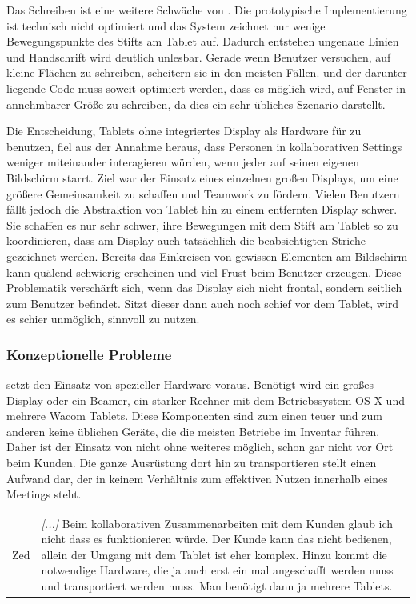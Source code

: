 \medskip Das Schreiben ist eine weitere Schwäche von \scribbler. Die prototypische Implementierung ist technisch nicht optimiert und das System zeichnet nur wenige Bewegungspunkte des Stifts am Tablet auf. Dadurch entstehen ungenaue Linien und Handschrift wird deutlich unlesbar. Gerade wenn Benutzer versuchen, auf kleine Flächen zu schreiben, scheitern sie in den meisten Fällen. \scribbler und der darunter liegende Code muss soweit optimiert werden, dass es möglich wird, auf Fenster in annehmbarer Größe zu schreiben, da dies ein sehr übliches Szenario darstellt.

\medskip Die Entscheidung, Tablets ohne integriertes Display als Hardware für \scribbler zu benutzen, fiel aus der Annahme heraus, dass Personen in kollaborativen Settings weniger miteinander interagieren würden, wenn jeder auf seinen eigenen Bildschirm starrt. Ziel war der Einsatz eines einzelnen großen Displays, um eine größere Gemeinsamkeit zu schaffen und Teamwork zu fördern. Vielen Benutzern fällt jedoch die Abstraktion von Tablet hin zu einem entfernten Display schwer. Sie schaffen es nur sehr schwer, ihre Bewegungen mit dem Stift am Tablet so zu koordinieren, dass am Display auch tatsächlich die beabsichtigten Striche gezeichnet werden. Bereits das Einkreisen von gewissen Elementen am Bildschirm kann quälend schwierig erscheinen und viel Frust beim Benutzer erzeugen. Diese Problematik verschärft sich, wenn das Display sich nicht frontal, sondern seitlich zum Benutzer befindet. Sitzt dieser dann auch noch schief vor dem Tablet, wird es schier unmöglich, \scribbler sinnvoll zu nutzen.

\subsubsection{Konzeptionelle Probleme}
\scribbler setzt den Einsatz von spezieller Hardware voraus. Benötigt wird ein großes Display oder ein Beamer, ein starker Rechner mit dem Betriebssystem OS X und mehrere Wacom Tablets. Diese Komponenten sind zum einen teuer und zum anderen keine üblichen Geräte, die die meisten Betriebe im Inventar führen. Daher ist der Einsatz von \scribbler nicht ohne weiteres möglich, schon gar nicht vor Ort beim Kunden. Die ganze Ausrüstung dort hin zu transportieren stellt einen Aufwand dar, der in keinem Verhältnis zum effektiven Nutzen innerhalb eines Meetings steht.

\begin{extract}[Notwendige Hardware schränkt ein.]
	{
		\myfloatalign
		\begin{tabularx}{\textwidth}{p{1.5cm}X}
			Zed & \emph{[...]} Beim kollaborativen Zusammenarbeiten mit dem Kunden glaub ich nicht dass es funktionieren würde. Der Kunde kann das nicht bedienen, allein der Umgang mit dem Tablet ist eher komplex. Hinzu kommt die notwendige Hardware, die ja auch erst ein mal angeschafft werden muss und transportiert werden muss. Man benötigt dann ja mehrere Tablets. 
		\end{tabularx}
	}
\end{extract}

